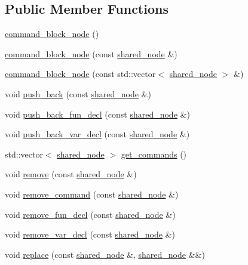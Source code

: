 \subsection*{Public Member Functions}
\begin{DoxyCompactItemize}
\item 
\hyperlink{classjawe_1_1command__block__node_a3114c27da8e02aaecae198adbc2444b7}{command\+\_\+block\+\_\+node} ()
\item 
\hyperlink{classjawe_1_1command__block__node_a833c98a4433d6ccffe9eca004cc92fdd}{command\+\_\+block\+\_\+node} (const \hyperlink{namespacejawe_a3f307481d921b6cbb50cc8511fc2b544}{shared\+\_\+node} \&)
\item 
\hyperlink{classjawe_1_1command__block__node_a4cbb669292fd23c022260f0b5ca6e88d}{command\+\_\+block\+\_\+node} (const std\+::vector$<$ \hyperlink{namespacejawe_a3f307481d921b6cbb50cc8511fc2b544}{shared\+\_\+node} $>$ \&)
\item 
void \hyperlink{classjawe_1_1command__block__node_acd62202eefef834ec691c91aef0692a5}{push\+\_\+back} (const \hyperlink{namespacejawe_a3f307481d921b6cbb50cc8511fc2b544}{shared\+\_\+node} \&)
\item 
void \hyperlink{classjawe_1_1command__block__node_a2e8b9839521f0b6020dc07ed12bfd952}{push\+\_\+back\+\_\+fun\+\_\+decl} (const \hyperlink{namespacejawe_a3f307481d921b6cbb50cc8511fc2b544}{shared\+\_\+node} \&)
\item 
void \hyperlink{classjawe_1_1command__block__node_a6b9109910ce8f64c7713f2d0bcf0407a}{push\+\_\+back\+\_\+var\+\_\+decl} (const \hyperlink{namespacejawe_a3f307481d921b6cbb50cc8511fc2b544}{shared\+\_\+node} \&)
\item 
std\+::vector$<$ \hyperlink{namespacejawe_a3f307481d921b6cbb50cc8511fc2b544}{shared\+\_\+node} $>$ \hyperlink{classjawe_1_1command__block__node_ab3c22d98d1174a7f2a3fc35ed1fae74b}{get\+\_\+commands} ()
\item 
void \hyperlink{classjawe_1_1command__block__node_a0eece1d8e15227e437204a6316ed5feb}{remove} (const \hyperlink{namespacejawe_a3f307481d921b6cbb50cc8511fc2b544}{shared\+\_\+node} \&)
\item 
void \hyperlink{classjawe_1_1command__block__node_a8100afe1d2ba0df43c8ac7827ced9d31}{remove\+\_\+command} (const \hyperlink{namespacejawe_a3f307481d921b6cbb50cc8511fc2b544}{shared\+\_\+node} \&)
\item 
void \hyperlink{classjawe_1_1command__block__node_a092957384e4095db729dc4f032676e59}{remove\+\_\+fun\+\_\+decl} (const \hyperlink{namespacejawe_a3f307481d921b6cbb50cc8511fc2b544}{shared\+\_\+node} \&)
\item 
void \hyperlink{classjawe_1_1command__block__node_ae06b2258671be36bbd1401c53363e9b4}{remove\+\_\+var\+\_\+decl} (const \hyperlink{namespacejawe_a3f307481d921b6cbb50cc8511fc2b544}{shared\+\_\+node} \&)
\item 
void \hyperlink{classjawe_1_1command__block__node_a0a4f2c34d319286001d2ac7992d310df}{replace} (const \hyperlink{namespacejawe_a3f307481d921b6cbb50cc8511fc2b544}{shared\+\_\+node} \&, \hyperlink{namespacejawe_a3f307481d921b6cbb50cc8511fc2b544}{shared\+\_\+node} \&\&)
\end{DoxyCompactItemize}

